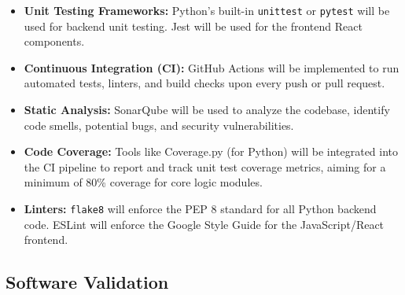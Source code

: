 \documentclass[12pt, titlepage]{article}
\begin{document}
\begin{itemize}
    \item \textbf{Unit Testing Frameworks:} Python’s built-in \texttt{unittest} or \texttt{pytest} will be used for backend unit testing. Jest will be used for the frontend React components.
    \item \textbf{Continuous Integration (CI):} GitHub Actions will be implemented to run automated tests, linters, and build checks upon every push or pull request.
    \item \textbf{Static Analysis:} SonarQube will be used to analyze the codebase, identify code smells, potential bugs, and security vulnerabilities.
    \item \textbf{Code Coverage:} Tools like Coverage.py (for Python) will be integrated into the CI pipeline to report and track unit test coverage metrics, aiming for a minimum of 80\% coverage for core logic modules.
    \item \textbf{Linters:} \texttt{flake8} will enforce the PEP 8 standard for all Python backend code. ESLint will enforce the Google Style Guide for the JavaScript/React frontend.
\end{itemize}



\subsection{Software Validation}





\end{document}
